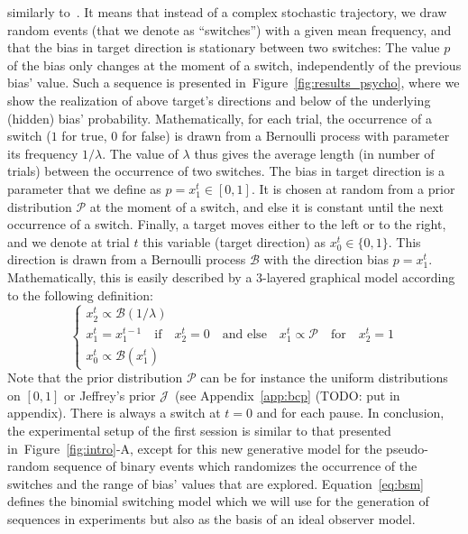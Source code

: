 \documentclass[profile,final,english,draft]{article}%
\newcommand{\choice}[1]{ %
	\left\{ %
		\begin{array}{l} #1 \end{array} %
	\right. }
\newcommand{\eql}[1]{\begin{equation}#1\end{equation}}
\newcommand{\Bb}{\mathcal{B}}
\newcommand{\Jj}{\mathcal{J}}
\newcommand{\Pp}{\mathcal{P}}
\newcommand{\citet}[1]{\textcite{#1}}
\newcommand{\seeFig}[1]{Figure~\ref{fig:#1}}
\newcommand{\seeEq}[1]{Equation~\ref{eq:#1}}
\newcommand{\seeApp}[1]{Appendix~\ref{app:#1}}
\begin{document}
similarly to~\citet{Meyniel13}.
It means that instead of a complex stochastic trajectory,
we draw random events (that we denote as ``switches'')
with a given mean frequency,
and that the bias in target direction is stationary between two switches:
The value $p$ of the bias only changes at the moment of a switch,
independently of the previous bias' value.
Such a sequence is presented in~\seeFig{results_psycho},
where we show the realization of above target's directions and
below of the underlying (hidden) bias' probability.
Mathematically, for each trial,
the occurrence of a switch ($1$ for true, $0$ for false)
is  drawn from a Bernoulli process with parameter its frequency $1/\lambda$.
The value of $\lambda$ thus gives the average length (in number of trials)
between the occurrence of two switches.
The bias in target direction is a parameter that we define as $p=x_1^t \in [0, 1]$.
It is chosen at random from a prior distribution $\Pp$ at the moment of a switch,
and else it is constant until the next occurrence of a switch.
Finally, a target moves either to the left or to the right,
and we denote at trial $t$ this variable (target direction) as $x_0^t\in \{ 0, 1 \}$.
This direction is drawn from a Bernoulli process $\Bb$
with the direction bias $p=x_1^t$.
Mathematically, this is easily described
by a 3-layered graphical model according to %
the following definition:
\eql{\choice{
x_2^t \propto \Bb(1/\lambda) \\
x_1^t = x_1^{t-1} \quad \text{if} \quad x_2^t=0 \quad \text{and else} \quad x_1^t \propto \Pp \quad \text{for} \quad x_2^t=1 \\
x_0^t \propto \Bb(x_1^t)
}\label{eq:bsm}}
Note that the prior distribution $\Pp$ can be for instance
the uniform distributions on $ [ 0, 1 ] $ or
Jeffrey's prior $\Jj$~(see \seeApp{bcp} (TODO: put in appendix).
There is always a switch at $t=0$ and for each pause.
In conclusion, the experimental setup of the first session
is similar to that presented in~\seeFig{intro}-A, except for
this new generative model for the pseudo-random sequence of binary events
which randomizes the occurrence of the switches
and the range of bias' values that are explored.
\seeEq{bsm} defines the binomial switching model which we will use
for the generation of sequences in experiments
but also as the basis of an ideal observer model.
\end{document}
